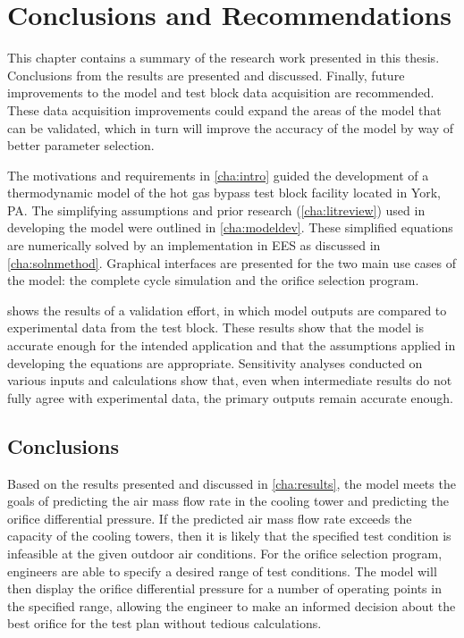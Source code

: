 \chapter{Conclusions and Recommendations} \label{cha:conclusion}
This chapter contains a summary of the research work presented in this thesis.
Conclusions from the results are presented and discussed.
Finally, future improvements to the model
and test block data acquisition are recommended.
These data acquisition improvements could expand the areas of the model that can
be validated, which in turn will improve the accuracy of the model by way of
better parameter selection.

The motivations and requirements in \cref{cha:intro} guided the development
of a thermodynamic model of the  hot gas bypass test block
facility located in York, PA.
The simplifying assumptions and prior research (\cref{cha:litreview}) 
used in developing the model were outlined in \cref{cha:modeldev}.
These simplified equations are numerically solved by an implementation
in EES as discussed in \cref{cha:solnmethod}.
Graphical interfaces are presented for the two main use cases of the model:
the complete cycle simulation and the orifice selection program.

 shows the results of a validation effort,
in which model outputs are compared to experimental data from the test block.
These results show that the model is accurate enough for the intended application
and that the assumptions applied in developing the equations are appropriate.
Sensitivity analyses conducted on various inputs and calculations show that,
even when intermediate results do not fully agree with experimental data,
the primary outputs remain accurate enough.

\section{Conclusions} \label{sec:conclusions}
Based on the results presented and discussed in \cref{cha:results},
the model meets the goals of predicting the air mass flow rate in the
cooling tower and predicting the orifice differential pressure.
If the predicted air mass flow rate exceeds the capacity of the cooling towers,
then it is likely that the specified test condition is infeasible at the given
outdoor air conditions.
For the orifice selection program, engineers are able to specify
a desired range of test conditions.
The model will then display the orifice differential pressure for 
a number of operating points in the specified range, allowing
the engineer to make an informed decision about the best orifice 
for the test plan without tedious calculations.

